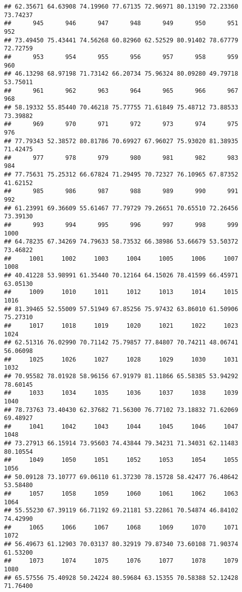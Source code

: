 \documentclass[
]{article}
\begin{document}
\begin{verbatim}
## 62.35671 64.63908 74.19960 77.67135 72.96971 80.13190 72.23360 73.74237 
##      945      946      947      948      949      950      951      952 
## 73.49450 75.43441 74.56268 60.82960 62.52529 80.91402 78.67779 72.72759 
##      953      954      955      956      957      958      959      960 
## 46.13298 68.97198 71.73142 66.20734 75.96324 80.09280 49.79718 53.75011 
##      961      962      963      964      965      966      967      968 
## 58.19332 55.85440 70.46218 75.77755 71.61849 75.48712 73.88533 73.39882 
##      969      970      971      972      973      974      975      976 
## 77.79343 52.38572 80.81786 70.69927 67.96027 75.93020 81.38935 71.42475 
##      977      978      979      980      981      982      983      984 
## 77.75631 75.25312 66.67824 71.29495 70.72327 76.10965 67.87352 41.62152 
##      985      986      987      988      989      990      991      992 
## 61.23991 69.36609 55.61467 77.79729 79.26651 70.65510 72.26456 73.39130 
##      993      994      995      996      997      998      999     1000 
## 64.78235 67.34269 74.79633 58.73532 66.38986 53.66679 53.50372 73.46822 
##     1001     1002     1003     1004     1005     1006     1007     1008 
## 40.41228 53.98991 61.35440 70.12164 64.15026 78.41599 66.45971 63.05130 
##     1009     1010     1011     1012     1013     1014     1015     1016 
## 81.39465 52.55009 57.51949 67.85256 75.97432 63.86010 61.50906 75.27310 
##     1017     1018     1019     1020     1021     1022     1023     1024 
## 62.51316 76.02990 70.71142 75.79857 77.84807 70.74211 48.06741 56.06098 
##     1025     1026     1027     1028     1029     1030     1031     1032 
## 70.95582 78.01928 58.96156 67.91979 81.11866 65.58385 53.94292 78.60145 
##     1033     1034     1035     1036     1037     1038     1039     1040 
## 78.73763 73.40430 62.37682 71.56300 76.77102 73.18832 71.62069 69.48927 
##     1041     1042     1043     1044     1045     1046     1047     1048 
## 73.27913 66.15914 73.95603 74.43844 79.34231 71.34031 62.11483 80.10554 
##     1049     1050     1051     1052     1053     1054     1055     1056 
## 50.09128 73.10777 69.06110 61.37230 78.15728 58.42477 76.48642 53.58480 
##     1057     1058     1059     1060     1061     1062     1063     1064 
## 55.55230 67.39119 66.71192 69.21181 53.22861 70.54874 46.84102 74.42990 
##     1065     1066     1067     1068     1069     1070     1071     1072 
## 56.49673 61.12903 70.03137 80.32919 79.87340 73.60108 71.90374 61.53200 
##     1073     1074     1075     1076     1077     1078     1079     1080 
## 65.57556 75.40928 50.24224 80.59684 63.15355 70.58388 52.12428 71.76400 

\end{verbatim}
\end{document}
